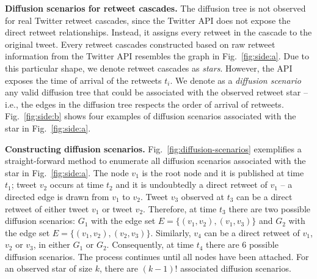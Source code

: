 \textbf{Diffusion scenarios for retweet cascades.}
The diffusion tree is not observed for real Twitter retweet cascades, since the Twitter API does not expose the direct retweet relationships.
Instead, it assigns every retweet in the cascade to the original tweet.
%
Every retweet cascades constructed based on raw retweet information from the Twitter API resembles the graph in Fig.~\ref{fig:side:a}.
Due to this particular shape, we denote retweet cascades as \emph{stars}.
However, the API exposes the time of arrival of the retweets $t_i$.
We denote as a \emph{diffusion scenario} any valid diffusion tree that could be associated with the observed retweet star -- i.e., the edges in the diffusion tree respects the order of arrival of retweets.
Fig.~\ref{fig:side:b} shows four examples of diffusion scenarios associated with the star in Fig.~\ref{fig:side:a}.

\textbf{Constructing diffusion scenarios.}
Fig.~\ref{fig:diffusion-scenarios} exemplifies a straight-forward method to enumerate all diffusion scenarios associated with the star in Fig.~\ref{fig:side:a}.
The node $v_1$ is the root node and it is published at time $t_1$;
tweet $v_2$ occurs at time $t_2$ and it is undoubtedly a direct retweet of $v_1$ -- a directed edge is drawn from $v_1$ to $v_2$. 
Tweet $v_3$ observed at $t_3$ can be a direct retweet of either tweet $v_1$ or tweet $v_2$.
Therefore, at time $t_3$ there are two possible diffusion scenarios: 
$G_1$ with the edge set $E = \lbrace (v_1, v_2), (v_1, v_3) \rbrace$ and $G_2$ with the edge set $E = \lbrace (v_1, v_2), (v_2, v_3) \rbrace$.
Similarly, $v_4$ can be a direct retweet of $v_1$, $v_2$ or $v_3$, in either $G_1$ or $G_2$.
Consequently, at time $t_4$ there are 6 possible diffusion scenarios.
The process continues until all nodes have been attached.
For an observed star of size $k$, there are $(k-1)!$ associated diffusion scenarios.

